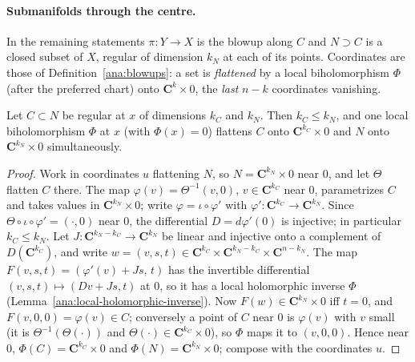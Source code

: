 \paragraph{Submanifolds through the centre.} In the remaining statements \(\pi\colon Y\to X\) is the blowup along \(C\) and
\(N\supset C\) is a closed subset of \(X\), regular of dimension \(k_N\) at each of its points. Coordinates are those of
Definition~\ref{ana:blowups}: a set is \emph{flattened} by a local biholomorphism \(\Phi\) (after the preferred chart) onto
\(\mathbf C^k\times0\), the \emph{last} \(n-k\) coordinates vanishing.

\begin{lemma}
\label{bcalc:nested-flattening}
\leanok
Let \(C\subset N\) be regular at \(x\) of dimensions \(k_C\) and \(k_N\). Then \(k_C\le k_N\), and one local biholomorphism
\(\Phi\) at \(x\) (with \(\Phi(x)=0\)) flattens \(C\) onto \(\mathbf C^{k_C}\times0\) and \(N\) onto \(\mathbf C^{k_N}\times0\) simultaneously.
\end{lemma}
\begin{proof}
\leanok
Work in coordinates \(u\) flattening \(N\), so \(N=\mathbf C^{k_N}\times0\) near \(0\), and let \(\Theta\) flatten \(C\) there. The map
\(\varphi(v)=\Theta^{-1}(v,0)\), \(v\in\mathbf C^{k_C}\) near \(0\), parametrizes \(C\) and takes values in \(\mathbf C^{k_N}\times0\); write
\(\varphi=\iota\circ\varphi'\) with \(\varphi'\colon\mathbf C^{k_C}\to\mathbf C^{k_N}\). Since \(\Theta\circ\iota\circ\varphi'=(\cdot,0)\) near
\(0\), the differential \(D=d\varphi'(0)\) is injective; in particular \(k_C\le k_N\). Let \(J\colon\mathbf C^{k_N-k_C}\to\mathbf C^{k_N}\) be
linear and injective onto a complement of \(D(\mathbf C^{k_C})\), and write \(w=(v,s,t)\in\mathbf C^{k_C}\times\mathbf C^{k_N-k_C}\times
\mathbf C^{n-k_N}\). The map \(F(v,s,t)=(\varphi'(v)+Js,\,t)\) has the invertible differential \((v,s,t)\mapsto(Dv+Js,t)\) at \(0\), so it
has a local holomorphic inverse \(\Phi\) (Lemma~\ref{ana:local-holomorphic-inverse}). Now \(F(w)\in\mathbf C^{k_N}\times0\) iff \(t=0\),
and \(F(v,0,0)=\varphi(v)\in C\); conversely a point of \(C\) near \(0\) is \(\varphi(v)\) with \(v\) small (it is
\(\Theta^{-1}(\Theta(\cdot))\) and \(\Theta(\cdot)\in\mathbf C^{k_C}\times0\)), so \(\Phi\) maps it to \((v,0,0)\). Hence near \(0\),
\(\Phi(C)=\mathbf C^{k_C}\times0\) and \(\Phi(N)=\mathbf C^{k_N}\times0\); compose with the coordinates \(u\).
\end{proof}

